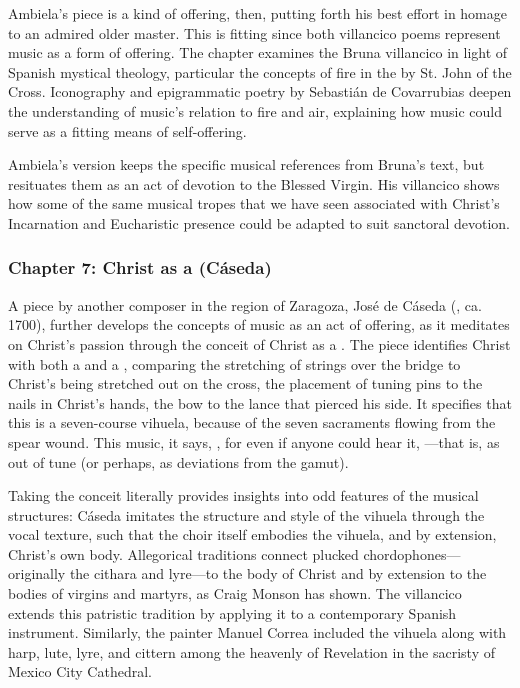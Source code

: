 \documentclass{vcbook-proposal}
\begin{document}
Ambiela's piece is a kind of offering, then, putting forth his best effort in homage to an admired older master.
This is fitting since both villancico poems represent music as a form of offering.
The chapter examines the Bruna villancico in light of Spanish mystical theology, particular the concepts of fire in the  by St. John of the Cross.
Iconography and epigrammatic poetry by Sebastián de Covarrubias deepen the understanding of music's relation to fire and air, explaining how music could serve as a fitting means of self-offering.

Ambiela's version keeps the specific musical references from Bruna's text, but resituates them as an act of devotion to the Blessed Virgin.
His villancico shows how some of the same musical tropes that we have seen associated with Christ's Incarnation and Eucharistic presence could be adapted to suit sanctoral devotion. 

\subsubsection{Chapter 7: Christ as a  (Cáseda)}

A piece by another composer in the region of Zaragoza, José de Cáseda (, ca. 1700), further develops the concepts of music as an act of offering, as it meditates on Christ's passion through the conceit of Christ as a . 
The piece identifies Christ with both a  and a , comparing the stretching of strings over the bridge to Christ's being stretched out on the cross, the placement of tuning pins to the nails in Christ's hands, the bow to the lance that pierced his side.
It specifies that this is a seven-course vihuela, because of the seven sacraments flowing from the spear wound.
This music, it says, , for even if anyone could hear it, ---that is, as out of tune (or perhaps, as  deviations from the gamut). 

Taking the conceit literally provides insights into odd features of the musical structures: Cáseda imitates the structure and style of the vihuela through the vocal texture, such that the choir itself embodies the vihuela, and by extension, Christ's own body.
Allegorical traditions connect plucked chordophones---originally the cithara and lyre---to the body of Christ and by extension to the bodies of virgins and martyrs, as Craig Monson has shown.%
  \autocite{Monson:DivasConvent}
The villancico extends this patristic tradition by applying it to a contemporary Spanish instrument.
Similarly, the painter Manuel Correa included the vihuela along with harp, lute, lyre, and cittern among the heavenly  of Revelation in the sacristy of Mexico City Cathedral.
\end{document}

